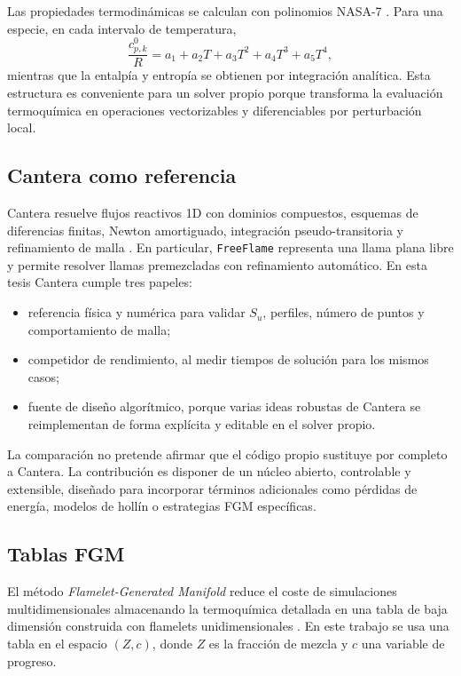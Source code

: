 \documentclass[12pt,a4paper]{article}
\begin{document}
Las propiedades termodinámicas se calculan con polinomios NASA-7 \cite{McBride2002}. Para una especie, en cada intervalo de temperatura,
\begin{equation}
  \frac{c_{p,k}^0}{R}
  =
  a_1+a_2T+a_3T^2+a_4T^3+a_5T^4,
  \label{eq:nasa_cp}
\end{equation}
mientras que la entalpía y entropía se obtienen por integración analítica. Esta estructura es conveniente para un solver propio porque transforma la evaluación termoquímica en operaciones vectorizables y diferenciables por perturbación local.

\subsection{Cantera como referencia}

Cantera resuelve flujos reactivos 1D con dominios compuestos, esquemas de diferencias finitas, Newton amortiguado, integración pseudo-transitoria y refinamiento de malla \cite{Cantera2023,CanteraDocs31}. En particular, \texttt{FreeFlame} representa una llama plana libre y permite resolver llamas premezcladas con refinamiento automático. En esta tesis Cantera cumple tres papeles:

\begin{itemize}
  \item referencia física y numérica para validar $S_u$, perfiles, número de puntos y comportamiento de malla;
  \item competidor de rendimiento, al medir tiempos de solución para los mismos casos;
  \item fuente de diseño algorítmico, porque varias ideas robustas de Cantera se reimplementan de forma explícita y editable en el solver propio.
\end{itemize}

La comparación no pretende afirmar que el código propio sustituye por completo a Cantera. La contribución es disponer de un núcleo abierto, controlable y extensible, diseñado para incorporar términos adicionales como pérdidas de energía, modelos de hollín o estrategias FGM específicas.

\subsection{Tablas FGM}

El método \textit{Flamelet-Generated Manifold} reduce el coste de simulaciones multidimensionales almacenando la termoquímica detallada en una tabla de baja dimensión construida con flamelets unidimensionales \cite{vanOijen2000}. En este trabajo se usa una tabla en el espacio $(Z,c)$, donde $Z$ es la fracción de mezcla y $c$ una variable de progreso.
\end{document}

